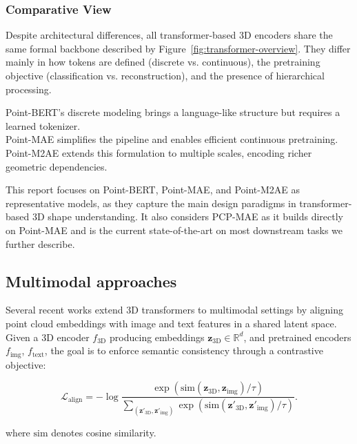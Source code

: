 \subsubsection{Comparative View}
\label{sssec:comparative_view}

Despite architectural differences, all transformer-based 3D encoders share the same formal backbone described by Figure~\ref{fig:transformer-overview}. They differ mainly in how tokens are defined (discrete vs. continuous), the pretraining objective (classification vs. reconstruction), and the presence of hierarchical processing.

Point-BERT’s discrete modeling brings a language-like structure but requires a learned tokenizer.\\
Point-MAE simplifies the pipeline and enables efficient continuous pretraining.\\
Point-M2AE extends this formulation to multiple scales, encoding richer geometric dependencies.

This report focuses on Point-BERT, Point-MAE, and Point-M2AE as representative models, as they capture the main design paradigms in transformer-based 3D shape understanding. It also considers PCP-MAE as it builds directly on Point-MAE and is the current state-of-the-art on most downstream tasks we further describe.



\subsection{Multimodal approaches}
\label{ssec:multimodal}

Several recent works extend 3D transformers to multimodal settings by aligning point cloud embeddings with image and text features in a shared latent space. Given a 3D encoder $f_{\text{3D}}$ producing embeddings $\mathbf{z}_{\text{3D}} \in \mathbb{R}^d$, and pretrained encoders $f_{\text{img}}$, $f_{\text{text}}$, the goal is to enforce semantic consistency through a contrastive objective:

\begin{equation}
  \mathcal{L}_{\text{align}} = 
  - \log 
  \frac{
    \exp\left(\text{sim}(\mathbf{z}_{\text{3D}}, \mathbf{z}_{\text{img}}) / \tau\right)
  }{
    \sum_{(\mathbf{z}'_{\text{3D}}, \mathbf{z}'_{\text{img}})}
    \exp\left(\text{sim}(\mathbf{z}'_{\text{3D}}, \mathbf{z}'_{\text{img}}) / \tau\right)
  }.
\end{equation}


where $\text{sim}$ denotes cosine similarity.

